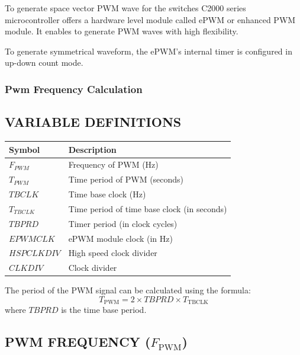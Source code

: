To generate space vector PWM wave for the switches C2000 series microcontroller offers a hardware level module called ePWM or enhanced PWM module. It enables to generate PWM waves with high flexibility.

To generate symmetrical waveform, the ePWM's internal timer is configured in up-down count mode.

\subsubsection{Pwm Frequency Calculation}

\subsection*{VARIABLE DEFINITIONS}

\renewcommand{\arraystretch}{1.5}
\begin{tabular}{|>{\bfseries}l|l|}
	\hline
	Symbol      & Description                                 \\ \hline
	$F_{PWM}$   & Frequency of PWM (Hz)                       \\ \hline
	$T_{PWM}$   & Time period of PWM (seconds)                \\ \hline
	$TBCLK$     & Time base clock (Hz)                        \\ \hline
	$T_{TBCLK}$ & Time period of time base clock (in seconds) \\ \hline
	$TBPRD$     & Timer period (in clock cycles)              \\ \hline
	$EPWMCLK$   & ePWM module clock (in Hz)                   \\ \hline
	$HSPCLKDIV$ & High speed clock divider                    \\ \hline
	$CLKDIV$    & Clock divider                               \\ \hline
\end{tabular}

\vspace{0.2in}
The period of the PWM signal can be calculated using the formula:
\begin{equation}
	T_{\text{PWM}} = 2 \times TBPRD \times T_{\text{TBCLK}}
\end{equation}
where \( TBPRD \) is the time base period.

\subsection{PWM FREQUENCY (\( F_{\text{PWM}} \))}

